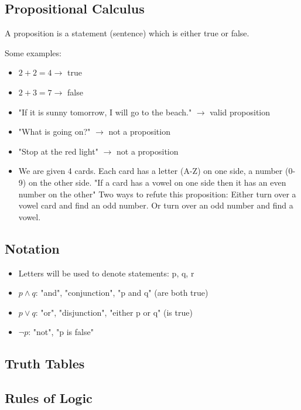 \documentclass[9pt, letterpaper, oneside]{article}
\begin{document}
\subsection{Propositional Calculus}

A proposition is a statement (sentence) which is either true or false.

Some examples:
\begin{itemize}
	\item $2 + 2 = 4 \rightarrow$ true
	\item $2+3 = 7 \rightarrow$ false
	\item "If it is sunny tomorrow, I will go to the beach." $\rightarrow$ valid proposition
	\item "What is going on?" $\rightarrow$ not a proposition
	\item "Stop at the red light" $\rightarrow$ not a proposition
	\item We are given 4 cards. Each card has a letter (A-Z) on one side, a number (0-9) on the other side. "If a card has a vowel on one side then it has an even number on the other" Two ways to refute this proposition: Either turn over a vowel card and find an odd number. Or turn over an odd number and find a vowel.
\end{itemize}

\subsection{Notation}
\begin{itemize}
	\item Letters will be used to denote statements: p, q, r
	\item $p \wedge q$: "and", "conjunction", "p and q" (are both true)
	\item $p \vee q$: "or", "disjunction", "either p or q" (is true)
	\item $\neg p$: "not", "p is false"	
\end{itemize}

\subsection{Truth Tables}

\subsection{Rules of Logic}
\end{document}
